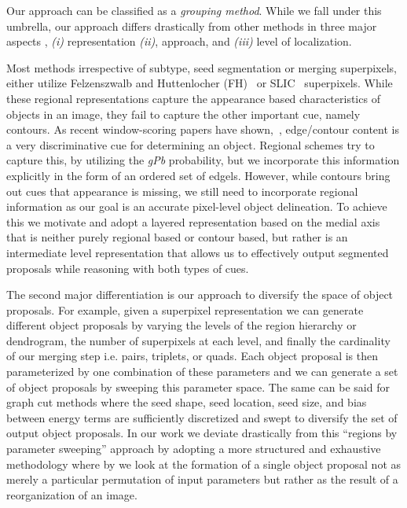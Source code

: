 Our approach can be classified as a \emph{grouping method}. While we fall under this umbrella, our approach differs drastically from other methods in three major aspects , \emph{(i)} representation \emph{(ii)}, approach, and \emph{(iii)} level of localization. 

Most methods irrespective of subtype, seed segmentation or merging superpixels, either utilize Felzenszwalb and Huttenlocher (FH)~\cite{Felzenszwalb:Huttenlocher:IJCV04} or SLIC~\cite{Achanta:etal:PAMI12} superpixels. While these regional representations capture the appearance based characteristics of objects in an image, they fail to capture the other important cue, namely contours. As recent window-scoring papers have shown,~\cite{Cheng:etal:CVPR14,Zitnick:Dollar:ECCV14,Lu:etal:ICCV15}, edge/contour content is a very discriminative cue for determining an object. Regional schemes try to capture this, by utilizing the \emph{gPb} probability, but we incorporate this information explicitly in the form of an ordered set of edgels. However, while contours bring out cues that appearance is missing, we still need to incorporate regional information as our goal is an accurate pixel-level object delineation.  To achieve this we motivate and adopt a layered representation based on the medial axis that is neither purely regional based or contour based, but rather is an intermediate level representation that allows us to effectively output segmented proposals while reasoning with both types of cues. 

The second major differentiation is our approach to diversify the space of object proposals.  For example, given a superpixel representation we can generate different object proposals by varying the levels of the region hierarchy or dendrogram, the number of superpixels at each level, and finally the cardinality of our merging step i.e. pairs, triplets, or quads. Each object proposal is then parameterized by one combination of these parameters and we can generate a set of object proposals by sweeping this parameter space. The same can be said for graph cut methods where the seed shape, seed location, seed size, and bias between energy terms are sufficiently discretized and swept to diversify the set of output object proposals. In our work we deviate drastically from this ``regions by parameter sweeping'' approach by adopting a more structured and exhaustive methodology where by we look at the formation of a single object proposal not as merely a particular permutation of input parameters but rather as the result of a reorganization of an image. 

